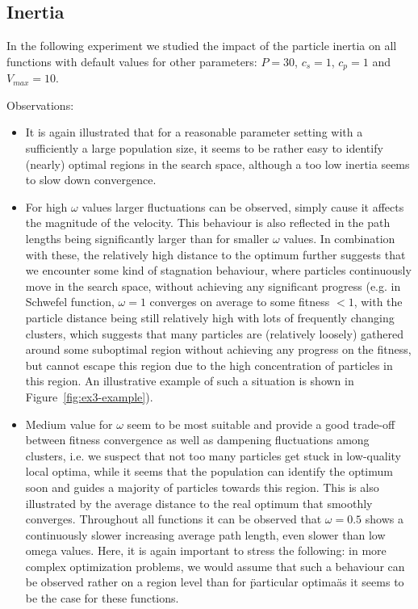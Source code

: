\documentclass[12pt]{article}
\begin{document}
\FloatBarrier
\subsection{Inertia}
In the following experiment we studied the impact of the particle inertia on all functions with default values for other parameters: $P=30$, $c_s=1$, $c_p=1$ and $V_{max}=10$. 

Observations:
\begin{itemize}
	\item It is again illustrated that for a reasonable parameter setting with a sufficiently a large population size, it seems to be rather easy to identify (nearly) optimal regions in the search space, although a too low inertia seems to slow down convergence. 
	\item For high $\omega$ values larger fluctuations can be observed, simply cause it affects the magnitude of the velocity. This behaviour is also reflected in the path lengths being significantly larger than for smaller $\omega$ values. In combination with these, the relatively high distance to the optimum further suggests that we encounter some kind of stagnation behaviour, where particles continuously move in the search space, without achieving any significant progress (e.g. in Schwefel function, $\omega=1$ converges on average to some fitness $<1$, with the particle distance being still relatively high with lots of frequently changing clusters, which suggests that many particles are (relatively loosely) gathered around some suboptimal region without achieving any progress on the fitness, but cannot escape this region due to the high concentration of particles in this region. An illustrative example of such a situation is shown in Figure~\ref{fig:ex3-example}).
	\item Medium value for $\omega$ seem to be most suitable and provide a good trade-off between fitness convergence as well as dampening fluctuations among clusters, i.e. we suspect that not too many particles get stuck in low-quality local optima, while it seems that the population can identify the optimum soon and guides a majority of particles towards this region. This is also illustrated by the average distance to the real optimum that smoothly converges. Throughout all functions it can be observed that $\omega=0.5$ shows a continuously slower increasing average path length, even slower than low omega values. Here, it is again important to stress the following: in more complex optimization problems, we would assume that such a behaviour can be observed rather on a region level than for \"particular optima\" as it seems to be the case for these functions.
\end{itemize}
\end{document}
